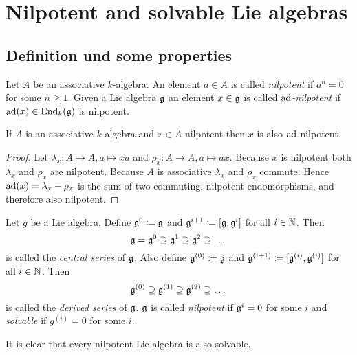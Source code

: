 \section{Nilpotent and solvable Lie algebras}





\subsection{Definition und some properties}


\begin{defi}
 Let $A$ be an associative $k$-algebra. An element $a \in A$ is called \emph{nilpotent} if $a^n = 0$ for some $n \geq 1$. Given a Lie algebra $\mathfrak{g}$ an element $x \in \mathfrak{g}$ is called \emph{$\operatorname{ad}$-nilpotent} if $\operatorname{ad}(x) \in \operatorname{End}_k(\mathfrak{g})$ is nilpotent.
\end{defi}


\begin{lem}
 If $A$ is an associative $k$-algebra and $x \in A$ nilpotent then $x$ is also $\operatorname{ad}$-nilpotent.
\end{lem}
\begin{proof}
 Let $\lambda_x \colon A \to A, a \mapsto xa$ and $\rho_x \colon A \to A, a \mapsto ax$. Because $x$ is nilpotent both $\lambda_x$ and $\rho_x$ are nilpotent. Because $A$ is associative $\lambda_x$ and $\rho_x$ commute. Hence $\operatorname{ad}(x) = \lambda_x - \rho_x$ is the sum of two commuting, nilpotent endomorphisms, and therefore also nilpotent.
\end{proof}


\begin{defi}
 Let $g$ be a Lie algebra. Define $\mathfrak{g}^0 \coloneqq \mathfrak{g}$ and $\mathfrak{g}^{i+1} \coloneqq [\mathfrak{g},\mathfrak{g}^i]$ for all $i \in \mathbb{N}$. Then
 \[
  \mathfrak{g} = \mathfrak{g}^0 \supseteq \mathfrak{g}^1 \supseteq \mathfrak{g}^2 \supseteq \dots
 \]
 is called the \emph{central series} of $\mathfrak{g}$. Also define $\mathfrak{g}^{(0)} \coloneqq \mathfrak{g}$ and $\mathfrak{g}^{(i+1)} \coloneqq [\mathfrak{g}^{(i)},\mathfrak{g}^{(i)}]$ for all $i \in \mathbb{N}$. Then
 \[
  \mathfrak{g}^{(0)} \supseteq \mathfrak{g}^{(1)} \supseteq \mathfrak{g}^{(2)} \supseteq \dots
 \]
 is called the \emph{derived series} of $\mathfrak{g}$. $\mathfrak{g}$ is called \emph{nilpotent} if $\mathfrak{g}^i = 0$ for some $i$ and \emph{solvable} if $g^{(i)} = 0$ for some $i$.
\end{defi}


It is clear that every nilpotent Lie algebra is also solvable.


